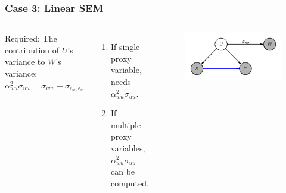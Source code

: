 \documentclass{beamer}
\begin{document}
\begin{frame}
\frametitle{Case 3: Linear SEM}

\begin{columns}

	Required: The contribution of $U$'s variance to $W$'s variance: $ \alpha_{wu}^2 \sigma_{uu} = \sigma_{ww} - \sigma_{\epsilon_w, \epsilon_w} $

	\bigskip

	\begin{enumerate}
		\item If single proxy variable, needs $ \alpha_{wu}^2 \sigma_{uu} $.
		\item If multiple proxy variables, $ \alpha_{wu}^2 \sigma_{uu} $ can be computed.
	\end{enumerate}

	\begin{figure}
    		\centering
    		\includegraphics[scale=0.6]{scripts/sem.png}
	\end{figure}
\end{columns}

\end{frame}
\end{document}
